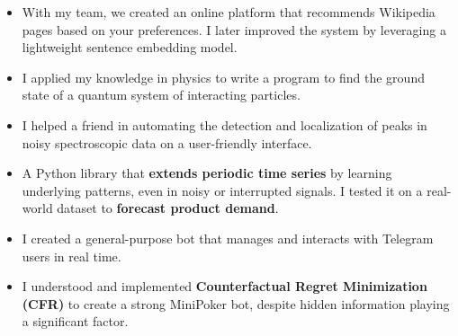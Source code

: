 \documentclass[10pt,a4paper,ragged2e,withhyper]{altacv}
\begin{document}
\divider

\begin{itemize}
\item With my team, we created an online platform that recommends Wikipedia pages based on your preferences. I later improved the system by leveraging a lightweight sentence embedding model.
\end{itemize}

\divider

\begin{itemize}
\item I applied my knowledge in physics to write a program to find the ground state of a quantum system of interacting particles.
\end{itemize}

\divider

\begin{itemize}
\item I helped a friend in automating the detection and localization of peaks in noisy spectroscopic data on a user-friendly interface.
\end{itemize}

\divider

\begin{itemize}
\item A Python library that \textbf{extends periodic time series} by learning underlying patterns, even in noisy or interrupted signals. I tested it on a real-world dataset to \textbf{forecast product demand}.
\end{itemize}

\divider

\begin{itemize}
\item I created a general-purpose bot that manages and interacts with Telegram users in real time.
\end{itemize}

\divider

\begin{itemize}
\item I understood and implemented \textbf{Counterfactual Regret Minimization (CFR)} to create a strong MiniPoker bot, despite hidden information playing a significant factor.
\end{itemize}
\end{document}
